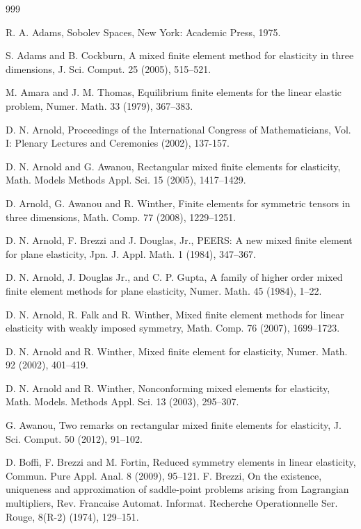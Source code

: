 \documentclass{amsart}
\numberwithin{table}{section}
\numberwithin{figure}{section}
\begin{document}
\begin{thebibliography}{999}

 R. A. Adams, Sobolev Spaces, New York: Academic
Press, 1975.

 S. Adams and B. Cockburn,
  A mixed finite element method for elasticity in three dimensions, J.
    Sci. Comput. 25 (2005),  515--521.

 M. Amara and J. M. Thomas,
   Equilibrium finite elements for the linear elastic problem, Numer.
    Math. 33 (1979), 367--383.

 D. N. Arnold,  Proceedings of the International Congress of Mathematicians, Vol. I: Plenary Lectures and Ceremonies (2002), 137-157.

 D. N. Arnold and G. Awanou,
   Rectangular mixed finite elements for elasticity, Math. Models
    Methods Appl. Sci. 15 (2005),  1417--1429.

    D. Arnold, G. Awanou and R. Winther,
   Finite elements for symmetric tensors in three dimensions,
    Math. Comp. 77 (2008),  1229--1251.

     D. N. Arnold, F. Brezzi and J. Douglas, Jr.,
     PEERS: A new mixed finite element for plane elasticity,
    Jpn. J. Appl. Math. 1 (1984),  347--367.

  D. N. Arnold, J. Douglas Jr., and C. P. Gupta,
    A family of higher order mixed finite element
    methods for plane elasticity, Numer. Math. 45 (1984),  1--22.

  D. N. Arnold, R. Falk and R. Winther,
  Mixed finite element methods for linear elasticity with
    weakly imposed symmetry, Math. Comp. 76 (2007),  1699--1723.


    D. N. Arnold and R. Winther,
    Mixed finite element for elasticity, Numer. Math. 92 (2002),
     401--419.

 D. N. Arnold and R. Winther,
   Nonconforming mixed elements for elasticity, Math. Models.
   Methods Appl. Sci. 13 (2003), 295--307.


 G. Awanou, Two remarks on rectangular mixed finite elements for elasticity, J. Sci.
 Comput. 50 (2012), 91--102.


   D. Boffi, F. Brezzi and M. Fortin,
   Reduced symmetry elements in linear elasticity, Commun.
    Pure Appl. Anal. 8 (2009),  95--121.
   F. Brezzi, On the existence, uniqueness and approximation of
   saddle-point problems arising from Lagrangian multipliers, Rev.
   Francaise Automat. Informat. Recherche Operationnelle Ser.
   Rouge, 8(R-2) (1974), 129--151.


\end{thebibliography}
\end{document}
